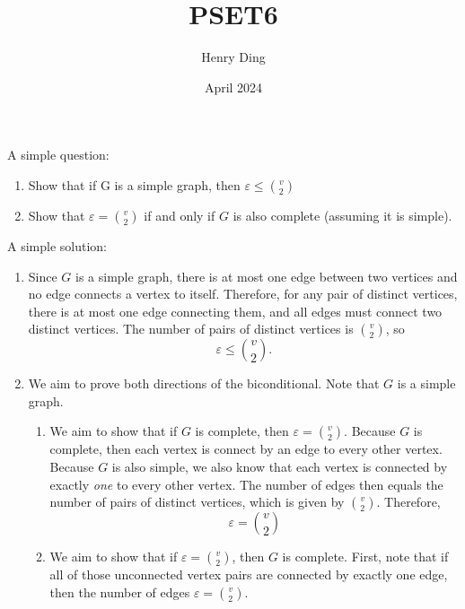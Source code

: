 \documentclass[12pt]{extarticle}
\title{PSET6}
\author{Henry Ding}
\date{April 2024}
\begin{document}
\maketitle

\begin{prob} \label{prob:problem_1}
	A simple question:
	\begin{enumerate}[label=(\alph*)]
		\item Show that if G is a simple graph, then $\varepsilon \leq \binom{v}{2}$
		\item Show that $\varepsilon = \binom{v}{2}$ if and only if $G$ is also complete (assuming it is simple).
	\end{enumerate}
\end{prob}

\begin{sol}
	A simple solution:
	\begin{enumerate}[label=(\alph*)]
		\item
		      Since $G$ is a simple graph, there is at most one edge between two vertices and no edge connects a vertex to itself.
		      Therefore, for any pair of distinct vertices, there is at most one edge connecting them, and all edges must connect two distinct vertices.
		      The number of pairs of distinct vertices is $\binom{v}{2}$, so
		      \begin{equation}
			      \varepsilon \leq \binom{v}{2}.
		      \end{equation}
		\item We aim to prove both directions of the biconditional. Note that $G$ is a simple graph.
		      \begin{enumerate}[label=\arabic*.]
			      \item We aim to show that if $G$ is complete, then $\varepsilon = \binom{v}{2}$.
			            Because $G$ is complete, then each vertex is connect by an edge to every other vertex.
			            Because $G$ is also simple, we also know that each vertex is connected by exactly \emph{one} to every other vertex.
			            The number of edges then equals the number of pairs of distinct vertices, which is given by $\binom{v}{2}$.
			            Therefore,
			            \begin{equation}
				            \varepsilon = \binom{v}{2}
			            \end{equation}
			      \item We aim to show that if $\varepsilon = \binom{v}{2}$, then $G$ is complete.
			            First, note that if all of those unconnected vertex pairs are connected by exactly one edge, then the number of edges $\varepsilon = \binom{v}{2}$.

\end{enumerate}
\end{enumerate}
\end{sol}
\end{document}
